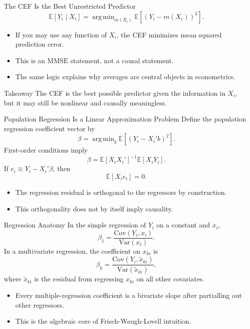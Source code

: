 \documentclass[11pt,aspectratio=169]{beamer}
\newcommand{\E}{\mathbb{E}}
\newcommand{\Var}{\mathrm{Var}}
\newcommand{\Cov}{\mathrm{Cov}}
\newcommand{\MMSE}{\mathrm{MMSE}}
\newcommand{\argmin}{\mathop{\mathrm{arg\,min}}}
\newcommand{\derivbutton}[1]{\vspace{0.4em}\hfill\hyperlink{app:#1}{\beamerbutton{Appendix details}}}
\begin{document}
\begin{frame}{The CEF Is the Best Unrestricted Predictor}
  \[
    \E[Y_i \mid X_i]
    =
    \argmin_{m(X_i)} \E\left[\left(Y_i-m(X_i)\right)^2\right].
  \]
  \begin{itemize}
    \item If you may use any function of \(X_i\), the CEF minimizes mean squared prediction error.
    \item This is an \(\MMSE\) statement, not a causal statement.
    \item The same logic explains why averages are central objects in econometrics.
  \end{itemize}
  \begin{block}{Takeaway}
    The CEF is the best possible predictor given the information in \(X_i\), but it may still be nonlinear and causally meaningless.
  \end{block}
\end{frame}

\begin{frame}{Population Regression Is a Linear Approximation Problem}
  \hypertarget{main:pop-reg}{}
  Define the population regression coefficient vector by
  \[
    \beta
    =
    \argmin_b \E\left[\left(Y_i-X_i'b\right)^2\right].
  \]
  First-order conditions imply
  \[
    \beta = \E[X_iX_i']^{-1}\E[X_iY_i].
  \]
  If \(e_i \equiv Y_i-X_i'\beta\), then
  \[
    \E[X_i e_i]=0.
  \]
  \begin{itemize}
    \item The regression residual is orthogonal to the regressors by construction.
    \item This orthogonality does not by itself imply causality.
  \end{itemize}
\end{frame}

\begin{frame}{Regression Anatomy}
  \hypertarget{main:anatomy}{}
  In the simple regression of \(Y_i\) on a constant and \(x_i\),
  \[
    \beta_1=\frac{\Cov(Y_i,x_i)}{\Var(x_i)}.
  \]
  In a multivariate regression, the coefficient on \(x_{ki}\) is
  \[
    \beta_k=\frac{\Cov(Y_i,\tilde{x}_{ki})}{\Var(\tilde{x}_{ki})},
  \]
  where \(\tilde{x}_{ki}\) is the residual from regressing \(x_{ki}\) on all other covariates.
  \begin{itemize}
    \item Every multiple-regression coefficient is a bivariate slope after partialling out other regressors.
    \item This is the algebraic core of Frisch-Waugh-Lovell intuition.
  \end{itemize}
  \derivbutton{anatomy-proof}
\end{frame}
\end{document}
